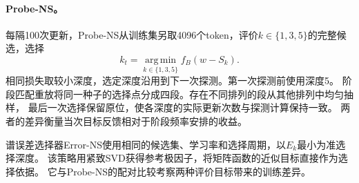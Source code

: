 \paragraph{Probe-NS。}
每隔100次更新，Probe-NS从训练集另取4096个token，评价$k\in\{1,3,5\}$的完整候选，选择
\begin{equation}
 k_t=\operatorname*{arg\,min}_{k\in\{1,3,5\}} f_B(w-S_k).
\end{equation}
相同损失取较小深度，选定深度沿用到下一次探测。第一次探测前使用深度5。
阶段匹配重放将同一种子的选择点分成四段。存在不同排列的段从其他排列中均匀抽样，
最后一次选择保留原位，使各深度的实际更新次数与探测计算保持一致。
两者的差异衡量当次目标反馈相对于阶段频率安排的收益。

谱误差选择器Error-NS使用相同的候选集、学习率和选择周期，以$E_k$最小为准选择深度。
该策略用紧致SVD获得参考极因子，将矩阵函数的近似目标直接作为选择依据。
它与Probe-NS的配对比较考察两种评价目标带来的训练差异。
